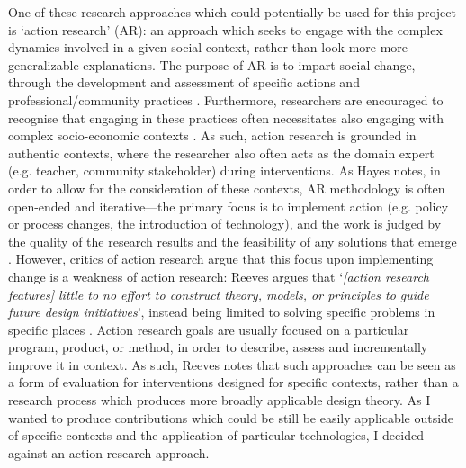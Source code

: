 One of these research approaches which could potentially be used for this project is `action research' (AR): an approach which seeks to engage with the complex dynamics involved in a given social context, rather than look more more generalizable explanations. The purpose of AR is to impart social change, through the development and assessment of specific actions and professional/community practices \citep{macdonald2012}. Furthermore, researchers are encouraged to recognise that engaging in these practices often necessitates also engaging with complex socio-economic contexts \citep{stringer2013}. As such, action research is grounded in authentic contexts, where the researcher also often acts as the domain expert (e.g. teacher, community stakeholder) during interventions. As Hayes notes, in order to allow for the consideration of these contexts, AR methodology is often open-ended and iterative---the primary focus is to implement action (e.g. policy or process changes, the introduction of technology), and the work is judged by the quality of the research results and the feasibility of any solutions that emerge \citep{hayes2011}. However, critics of action research argue that this focus upon implementing change is a weakness of action research: Reeves argues that `\textit{[action research features] little to no effort to construct theory, models, or principles to guide future design initiatives}', instead being limited to solving specific problems in specific places \citep{reeves2000}. Action research goals are usually focused on a particular program, product, or method, in order to describe, assess and incrementally improve it in context. As such, Reeves notes that such approaches can be seen as a form of evaluation for interventions designed for specific contexts, rather than a research process which produces more broadly applicable design theory. As I wanted to produce contributions which could be still be easily applicable outside of specific contexts and the application of particular technologies, I decided against an action research approach.

